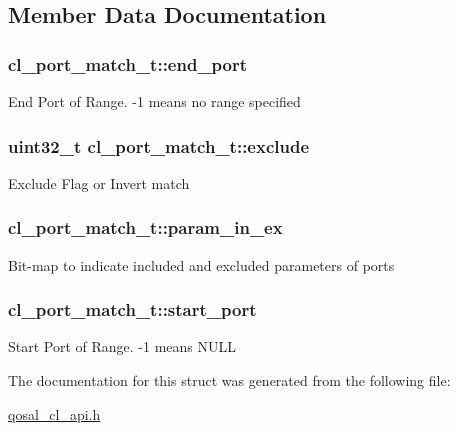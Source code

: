 \subsection{Member Data Documentation}
\hypertarget{structcl__port__match__t_ab60b9e124c5fab2e386db5c56ca0b29e}{
\subsubsection[{end\-\_\-port}]{ cl\-\_\-port\-\_\-match\-\_\-t\-::end\-\_\-port}}\label{structcl__port__match__t_ab60b9e124c5fab2e386db5c56ca0b29e}
End Port of Range. -\/1 means no range specified \hypertarget{structcl__port__match__t_ac56f054e94afc53e86dd1cb2b30002f1}{
\subsubsection[{exclude}]{\setlength{\rightskip}{0pt plus 5cm}uint32\-\_\-t cl\-\_\-port\-\_\-match\-\_\-t\-::exclude}}\label{structcl__port__match__t_ac56f054e94afc53e86dd1cb2b30002f1}
Exclude Flag or Invert match \hypertarget{structcl__port__match__t_a3138505b41869c1e025ecd89a9c51254}{
\subsubsection[{param\-\_\-in\-\_\-ex}]{ cl\-\_\-port\-\_\-match\-\_\-t\-::param\-\_\-in\-\_\-ex}}\label{structcl__port__match__t_a3138505b41869c1e025ecd89a9c51254}
Bit-\/map to indicate included and excluded parameters of ports \hypertarget{structcl__port__match__t_a4f712b7d51dae753194f9fd577312087}{
\subsubsection[{start\-\_\-port}]{ cl\-\_\-port\-\_\-match\-\_\-t\-::start\-\_\-port}}\label{structcl__port__match__t_a4f712b7d51dae753194f9fd577312087}
Start Port of Range. -\/1 means N\-U\-L\-L 

The documentation for this struct was generated from the following file\-:\begin{DoxyCompactItemize}
\item 
\hyperlink{qosal__cl__api_8h}{qosal\-\_\-cl\-\_\-api.\-h}\end{DoxyCompactItemize}

